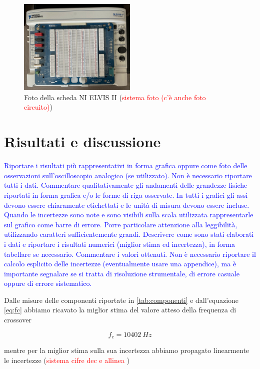 \documentclass[12pt,italian]{article}
\newcommand{\prof}[1]{\textcolor{blue}{#1}}
\newcommand{\err}[1]{\textcolor{red}{#1}}
\begin{document}
\begin{figure}[h]
	\centering
	\includegraphics[width=0.5\textwidth]{Images/Elvis.jpg}
	\caption{Foto della scheda NI ELVIS II (\err{sistema foto (c'è anche foto circuito)})}
	\label{fig:Elvis}
\end{figure}

\section*{Risultati e discussione}
\prof{ Riportare i risultati più rappresentativi in forma grafica oppure come
	foto delle osservazioni sull'oscilloscopio analogico (se utilizzato). Non è
	necessario riportare tutti i dati. Commentare qualitativamente gli andamenti
	delle grandezze fisiche riportati in forma grafica e/o le forme di riga
	osservate. In tutti i grafici gli assi devono essere chiaramente etichettati e
	le unità di misura devono essere incluse. Quando le incertezze sono note e
	sono visibili sulla scala utilizzata rappresentarle sul grafico come barre di
	errore. Porre particolare attenzione alla leggibilità, utilizzando caratteri
	sufficientemente grandi. Descrivere come sono stati elaborati i dati e
	riportare i risultati numerici (miglior stima ed incertezza), in forma
	tabellare se necessario. Commentare i valori ottenuti. Non è necessario
	riportare il calcolo esplicito delle incertezze (eventualmente usare una
	appendice), ma è importante segnalare se si tratta di risoluzione strumentale,
	di errore casuale oppure di errore sistematico. }

Dalle misure delle componenti riportate in \cref{tab:componenti} e
dall'equazione \eqref{eq:fc} abbiamo ricavato la miglior stima del valore
atteso della frequenza di crossover

\begin{equation*}
	f_{c} = 10402 \ Hz
\end{equation*}

\noindent
mentre per la miglior stima sulla sua incertezza abbiamo propagato linearmente
le incertezze (\err{sistema cifre dec e allinea })
\end{document}
